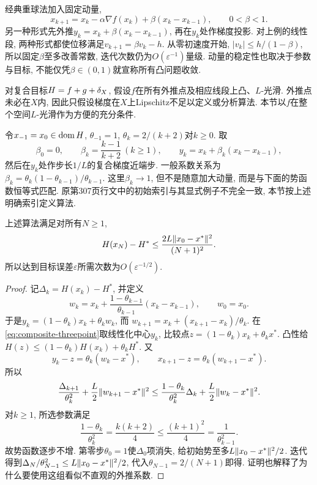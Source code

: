 经典重球法加入固定动量,
\[
 x_{k+1}=x_k-\alpha\nabla f(x_k)+\beta(x_k-x_{k-1}),\qquad0<\beta<1.
\]
另一种形式先外推$y_k=x_k+\beta(x_k-x_{k-1})$, 再在$y_k$处作梯度投影. 对上例的线性段, 两种形式都使位移满足$v_{k+1}=\beta v_k-h$. 从零初速度开始, $|v_k|\le h/(1-\beta)$, 所以固定$\beta$至多改善常数, 迭代次数仍为$O(\varepsilon^{-1})$量级. 动量的稳定性也取决于参数与目标, 不能仅凭$\beta\in(0,1)$就宣称所有凸问题收敛.

对复合目标$H=f+g+\delta_{X}$, 假设$f$在所有外推点及相应线段上凸、$L$-光滑. 外推点未必在$X$内, 因此只假设梯度在$X$上Lipschitz不足以定义或分析算法. 本节以$f$在整个空间$L$-光滑作为方便的充分条件.

令$x_{-1}=x_0\in\operatorname{dom} H$, $\theta_{-1}=1$, $\theta_k=2/(k+2)$对$k\ge0$. 取
\[
 \beta_0=0,\qquad\beta_k=\frac{k-1}{k+2}\ (k\ge1),\qquad
 y_k=x_k+\beta_k(x_k-x_{k-1}),
\]
然后在$y_k$处作步长$1/L$的复合梯度近端步. 一般系数关系为$\beta_k=\theta_k(1-\theta_{k-1})/\theta_{k-1}$. 这里$\beta_k\to1$, 但不是随意加大动量, 而是与下面的势函数恒等式匹配. 原第307页行文中的初始索引与其显式例子不完全一致, 本节按上述明确索引定义算法.

\begin{theorem}\label{thm:accelerated-complexity}
上述算法满足对所有$N\ge1$,
\[
 H(x_N)-H^*\le\frac{2L\lVert x_0-x^*\rVert^2}{(N+1)^2}.
\]
所以达到目标误差$\varepsilon$所需次数为$O(\varepsilon^{-1/2})$.
\end{theorem}
\begin{proof}
记$\Delta_k=H(x_k)-H^*$, 并定义
\[
 w_k=x_k+\frac{1-\theta_{k-1}}{\theta_{k-1}}(x_k-x_{k-1}),\qquad w_0=x_0.
\]
于是$y_k=(1-\theta_k)x_k+\theta_k w_k$, 而
$w_{k+1}=x_k+(x_{k+1}-x_k)/\theta_k$. 在\eqref{eq:composite-threepoint}取线性化中心$y_k$, 比较点$z=(1-\theta_k)x_k+\theta_k x^*$. 凸性给$H(z)\le(1-\theta_k)H(x_k)+\theta_k H^*$. 又
\[
 y_k-z=\theta_k(w_k-x^*),\qquad x_{k+1}-z=\theta_k(w_{k+1}-x^*).
\]
所以
\begin{equation}\label{eq:accelerated-energy}
 \frac{\Delta_{k+1}}{\theta_k^2}+\frac L2\lVert w_{k+1}-x^*\rVert^2
 \le\frac{1-\theta_k}{\theta_k^2}\Delta_k+\frac L2\lVert w_k-x^*\rVert^2.
\end{equation}
对$k\ge1$, 所选参数满足
\[
 \frac{1-\theta_k}{\theta_k^2}=\frac{k(k+2)}4
 \le\frac{(k+1)^2}4=\frac1{\theta_{k-1}^2}.
\]
故势函数逐步不增. 第零步$\theta_0=1$使$\Delta_0$项消失, 给初始势至多$L\lVert x_0-x^*\rVert^2/2$. 迭代得到$\Delta_N/\theta_{N-1}^2\le L\lVert x_0-x^*\rVert^2/2$, 代入$\theta_{N-1}=2/(N+1)$即得. 证明也解释了为什么要使用这组看似不直观的外推系数.
\end{proof}

